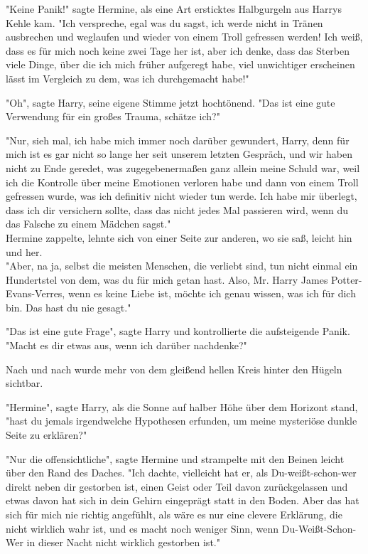 {"Keine Panik!" sagte Hermine, als eine Art ersticktes Halbgurgeln aus Harrys Kehle kam. "Ich verspreche, egal was du sagst, ich werde nicht in Tränen ausbrechen und weglaufen und wieder von einem Troll gefressen werden! Ich weiß, dass es für mich noch keine zwei Tage her ist, aber ich denke, dass das Sterben viele Dinge, über die ich mich früher aufgeregt habe, viel unwichtiger erscheinen lässt im Vergleich zu dem, was ich durchgemacht habe!"

"Oh", sagte Harry, seine eigene Stimme jetzt hochtönend. "Das ist eine gute Verwendung für ein großes Trauma, schätze ich?"

"Nur, sieh mal, ich habe mich immer noch darüber gewundert, Harry, denn für mich ist es gar nicht so lange her seit unserem letzten Gespräch, und wir haben nicht zu Ende geredet, was zugegebenermaßen ganz allein meine Schuld war, weil ich die Kontrolle über meine Emotionen verloren habe und dann von einem Troll gefressen wurde, was ich definitiv nicht wieder tun werde. Ich habe mir überlegt, dass ich dir versichern sollte, dass das nicht jedes Mal passieren wird, wenn du das Falsche zu einem Mädchen sagst."\\ Hermine zappelte, lehnte sich von einer Seite zur anderen, wo sie saß, leicht hin und her.\\ "Aber, na ja, selbst die meisten Menschen, die verliebt sind, tun nicht einmal ein Hundertstel von dem, was du für mich getan hast. Also, Mr. Harry James Potter-Evans-Verres, wenn es keine Liebe ist, möchte ich genau wissen, was ich für dich bin. Das hast du nie gesagt."

"Das ist eine gute Frage", sagte Harry und kontrollierte die aufsteigende Panik. "Macht es dir etwas aus, wenn ich darüber nachdenke?"

Nach und nach wurde mehr von dem gleißend hellen Kreis hinter den Hügeln sichtbar.

"Hermine", sagte Harry, als die Sonne auf halber Höhe über dem Horizont stand,\\ "hast du jemals irgendwelche Hypothesen erfunden, um meine mysteriöse dunkle Seite zu erklären?"

"Nur die offensichtliche", sagte Hermine und strampelte mit den Beinen leicht über den Rand des Daches. "Ich dachte, vielleicht hat er, als Du-weißt-schon-wer direkt neben dir gestorben ist, einen Geist oder Teil davon zurückgelassen und etwas davon hat sich in dein Gehirn eingeprägt statt in den Boden. Aber das hat sich für mich nie richtig angefühlt, als wäre es nur eine clevere Erklärung, die nicht wirklich wahr ist, und es macht noch weniger Sinn, wenn Du-Weißt-Schon-Wer in dieser Nacht nicht wirklich gestorben ist."

}
